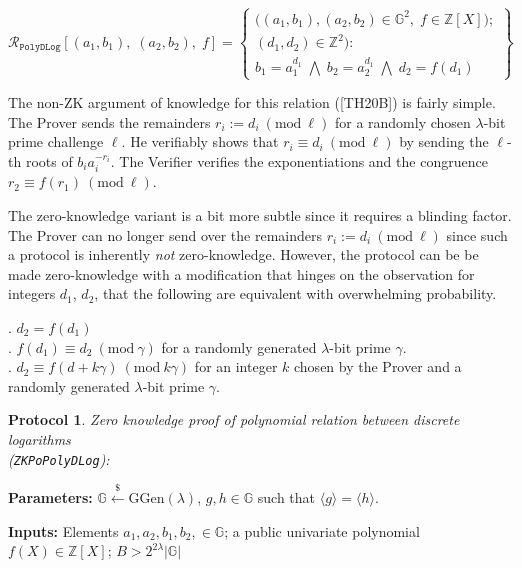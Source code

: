 \documentclass[11pt, lettersize, notitlepage, leqno, footskip=0.6cm]{article}
\newcommand{\bz}{\mathbb Z}
\newcommand{\ttt}{\texttt}
\newcommand{\bG}{\mathbb{G}}
\newcommand{\la}{\langle}
\newcommand{\ra}{\rangle}
\newcommand{\mc}{\mathcal}
\newcommand{\mb}{\mathbb}
\newcommand{\mr}{\mathrm}
\newcommand{\lam}{\lambda}
\newcommand{\lamb}{\lambda}
\newcommand{\noin}{\noindent}
\newcommand{\op}{overwhelming probability}
\newcommand{\Mod}[1]{\ (\mathrm{mod}\ #1)}
\newtheorem{Prot}[Thm]{Protocol}
\numberwithin{equation}{section}
\begin{document}
\[
  \mc{R}_{{\ttt{PolyDLog}}}[(a_1, b_1),\;(a_2,b_2),\;f] = \left\{\begin{array}{l}
    \big((a_1, b_1), (a_2,b_2)\in\mb{G}^2,\;f\in\bz[X]\big);\\
    (d_1, d_2)\in\mb{Z}^2): \\
    b_1 = a_1^{d_1}\; \bigwedge\; b_2 = a_2^{d_1}\; \bigwedge \;d_2 = f(d_1)
  \end{array}\right\}
\] 

\vspace{0.1cm}

The non-ZK argument of knowledge for this relation ([TH20B]) is fairly simple. The Prover sends the remainders $r_i:= d_i\Mod{\ell}$ for a randomly chosen $\lam$-bit prime challenge $\ell$. He verifiably shows that $r_i\equiv d_i\Mod{\ell}$ by sending the $\ell$-th roots of $b_ia_i^{-r_i}$. The Verifier verifies the exponentiations and the congruence $r_2\equiv f(r_1)\Mod{\ell}$.

The zero-knowledge variant is a bit more subtle since it requires a blinding factor. The Prover can no longer send over the remainders $r_i:= d_i\Mod{\ell}$ since such a protocol is inherently \textit{not} zero-knowledge. However, the protocol can be be made zero-knowledge with a modification that hinges on the observation for integers $d_1$, $d_2$,  that the following are equivalent with \op.\vspace{0.1cm}

\noin 1. $d_2 = f(d_1)$\\
\noin 2. $f(d_1)\equiv d_2\Mod{\gamma}$ for a randomly generated $\lam$-bit prime $\gamma$.\\
\noin 3. $d_2 \equiv f(d+k\gamma)\Mod{k\gamma} $ for an integer $k$ chosen by the Prover and a randomly generated $\lam$-bit prime $\gamma$. \vspace{0.1cm}



\begin{Prot} \normalfont \hypertarget{Poly}{\textit{Zero knowledge proof of polynomial relation between discrete logarithms}}\\ (\verb|ZKPoPolyDLog|):\end{Prot} \vspace{-0.3cm}

\noin \textbf{Parameters:} $\mb{G}\xleftarrow{\$} \mr{GGen}(\lamb)$,  $g,h\in \mb{G}$ such that $\la g \ra = \la h \ra$.

\noin \textbf{Inputs:} Elements $a_1,a_2, b_1, b_2,  \in \mb{G}$; a public univariate polynomial $f(X)\in \bz[X]$; $B > 2^{2\lam}|\bG|$
\end{document}
